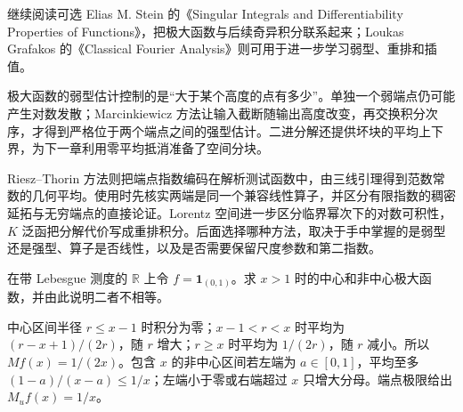 \ProseParagraphBreak

继续阅读可选 Elias M. Stein 的《Singular Integrals and Differentiability Properties of Functions》\cite{Stein1970Singular}，把极大函数与后续奇异积分联系起来；Loukas Grafakos 的《Classical Fourier Analysis》\cite{Grafakos2014Classical}则可用于进一步学习弱型、重排和插值。






\begin{chaptersummary}
极大函数的弱型估计控制的是“大于某个高度的点有多少”。单独一个弱端点仍可能产生对数发散；Marcinkiewicz 方法让输入截断随输出高度改变，再交换积分次序，才得到严格位于两个端点之间的强型估计。二进分解还提供坏块的平均上下界，为下一章利用零平均抵消准备了空间分块。

\ProseParagraphBreak

Riesz--Thorin 方法则把端点指数编码在解析测试函数中，由三线引理得到范数常数的几何平均。使用时先核实两端是同一个兼容线性算子，并区分有限指数的稠密延拓与无穷端点的直接论证。Lorentz 空间进一步区分临界幂次下的对数可积性，\(K\) 泛函把分解代价写成重排积分。后面选择哪种方法，取决于手中掌握的是弱型还是强型、算子是否线性，以及是否需要保留尺度参数和第二指数。
\end{chaptersummary}

\BookExercises

\begin{exercise}\label{b2:ex:17-new-1}
在带 Lebesgue 测度的 \(\mathbb R\) 上令 \(f=\mathbf1_{(0,1)}\)。求 \(x>1\) 时的中心和非中心极大函数，并由此说明二者不相等。
\end{exercise}
\begin{solution}
中心区间半径 \(r\leq x-1\) 时积分为零；\(x-1<r<x\) 时平均为 \((r-x+1)/(2r)\)，随 \(r\) 增大；\(r\geq x\) 时平均为 \(1/(2r)\)，随 \(r\) 减小。所以 \(Mf(x)=1/(2x)\)。包含 \(x\) 的非中心区间若左端为 \(a\in[0,1]\)，平均至多 \((1-a)/(x-a)\leq1/x\)；左端小于零或右端超过 \(x\) 只增大分母。端点极限给出 \(M_uf(x)=1/x\)。
\end{solution}

